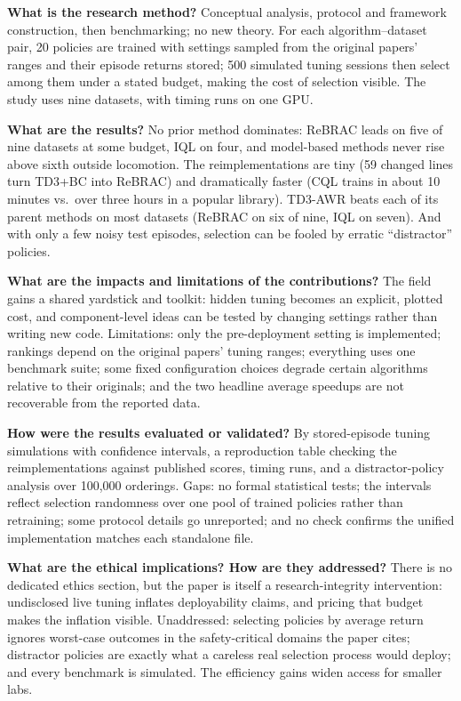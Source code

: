 \documentclass[11pt]{article}
\newcommand{\q}[2]{\item \textbf{#1} #2}
\begin{document}
\begin{qna}
\q{What is the research method?}
Conceptual analysis, protocol and framework construction, then benchmarking; no new theory. For each algorithm--dataset pair, 20 policies are trained with settings sampled from the original papers' ranges and their episode returns stored; 500 simulated tuning sessions then select among them under a stated budget, making the cost of selection visible. The study uses nine datasets, with timing runs on one GPU.

\q{What are the results?}
No prior method dominates: ReBRAC leads on five of nine datasets at some budget, IQL on four, and model-based methods never rise above sixth outside locomotion. The reimplementations are tiny (59 changed lines turn TD3+BC into ReBRAC) and dramatically faster (CQL trains in about 10 minutes vs.\ over three hours in a popular library). TD3-AWR beats each of its parent methods on most datasets (ReBRAC on six of nine, IQL on seven). And with only a few noisy test episodes, selection can be fooled by erratic ``distractor'' policies.

\q{What are the impacts and limitations of the contributions?}
The field gains a shared yardstick and toolkit: hidden tuning becomes an explicit, plotted cost, and component-level ideas can be tested by changing settings rather than writing new code. Limitations: only the pre-deployment setting is implemented; rankings depend on the original papers' tuning ranges; everything uses one benchmark suite; some fixed configuration choices degrade certain algorithms relative to their originals; and the two headline average speedups are not recoverable from the reported data.

\q{How were the results evaluated or validated?}
By stored-episode tuning simulations with confidence intervals, a reproduction table checking the reimplementations against published scores, timing runs, and a distractor-policy analysis over 100{,}000 orderings. Gaps: no formal statistical tests; the intervals reflect selection randomness over one pool of trained policies rather than retraining; some protocol details go unreported; and no check confirms the unified implementation matches each standalone file.

\q{What are the ethical implications? How are they addressed?}
There is no dedicated ethics section, but the paper is itself a research-integrity intervention: undisclosed live tuning inflates deployability claims, and pricing that budget makes the inflation visible. Unaddressed: selecting policies by average return ignores worst-case outcomes in the safety-critical domains the paper cites; distractor policies are exactly what a careless real selection process would deploy; and every benchmark is simulated. The efficiency gains widen access for smaller labs.


\end{qna}
\end{document}
